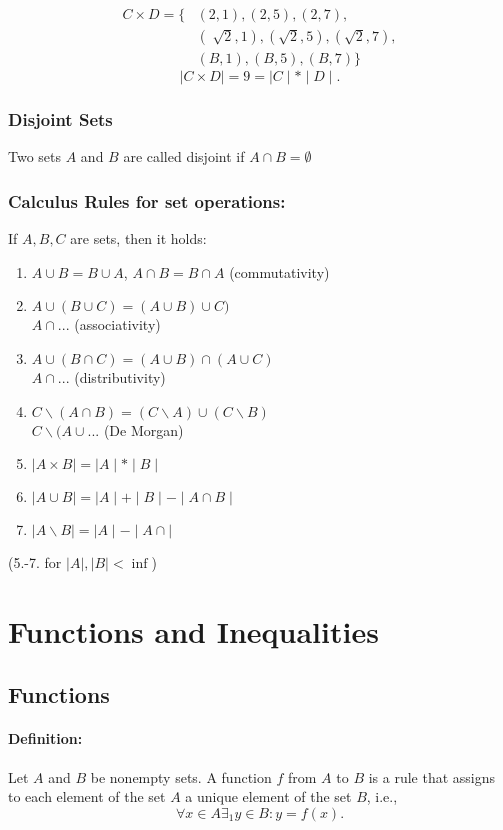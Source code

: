 \documentclass[twocolumn]{article}
\begin{document}
				\[
				\begin{split}
					C\times D=\{ & (2,1),(2,5),(2,7),\\
						     & (\sqrt[]{2},1),(\sqrt 2,5),(\sqrt2,7),\\
						     & (B,1),(B,5),(B,7)\}
				\end{split}
				\] 
				\[
				\mid C\times D\mid=9=\mid C\mid*\mid D\mid
				.\] 
		\subsubsection{Disjoint Sets}
			Two sets $A$ and $B$ are called disjoint if $A\cap B=\emptyset$ 
		
		\subsubsection{Calculus Rules for set operations:}
			If $A,B,C$ are sets, then it holds:
			\begin{enumerate}
			\item $A\cup B=B\cup A$, $A\cap B=B\cap A$ (commutativity)
			\item $A\cup(B\cup C)=(A\cup B)\cup C)$ \\
				$A\cap...$ (associativity)
			\item $A\cup(B\cap C)=(A\cup B)\cap(A\cup C)$\\
				$A\cap...$ (distributivity)
			\item $C\backslash(A\cap B)=(C\backslash A)\cup(C\backslash B)$\\
				$C\backslash(A\cup...$  (De Morgan)
			\item $\mid A\times B\mid=\mid A\mid*\mid B\mid$
			\item $\mid A\cup B\mid=\mid A\mid+\mid B\mid -\mid A\cap B\mid$
			\item $\mid A\backslash B\mid =\mid A\mid -\mid A\cap\mid $ 
			\end{enumerate}
			(5.-7. for $\mid A\mid,\mid B\mid<\inf$)

\section{Functions and Inequalities}
	\subsection{Functions}
		\paragraph{Definition:}
			Let $A$ and $B$ be nonempty sets. A function $f$ from $A$ to $B$ is 
			a rule that assigns to each element of the set $A$ a unique element 
			of the set $B$, i.e., 
			\[
			\forall x\in A\exists_1y\in B:y=f(x)
			.\] 
		
\end{document}
